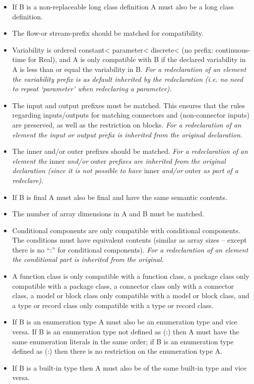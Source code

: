 \documentclass[10pt,a4paper]{report}
\begin{document}
\begin{itemize}
  \begin{itemize}
  \item
    If B is a non-replaceable long class definition A must also be a
    long class definition.
  \item
    The flow-or stream-prefix should be matched for compatibility.
  \item
    Variability is ordered constant\textless{} parameter\textless{}
    discrete\textless{} (no prefix: continuous-time for Real), and A is
    only compatible with B if the declared variability in A is less than
    or equal the variability in B. \emph{For a redeclaration of an
    element the variability prefix is as default inherited by the
    redeclaration (i.e. no need to repeat `parameter' when redeclaring a
    parameter).}
  \item
    The input and output prefixes must be matched. This ensures that the
    rules regarding inputs/outputs for matching connectors and
    (non-connector inputs) are preserved, as well as the restriction on
    blocks. \emph{For a redeclaration of an element the input or output
    prefix is inherited from the original declaration.}
  \item
    The inner and/or outer prefixes should be matched. \emph{For a
    redeclaration of an element the} inner \emph{and/or} outer
    \emph{prefixes are inherited from the original declaration (since it
    is not possible to have} inner \emph{and/or} outer \emph{as part of
    a redeclare)}.
  \item
    If B is final A must also be final and have the same semantic
    contents.
  \item
    The number of array dimensions in A and B must be matched.
  \item
    Conditional components are only compatible with conditional
    components. The conditions must have equivalent contents (similar as
    array sizes -- except there is no ``:'' for conditional components).
    \emph{For a redeclaration of an element the conditional part is
    inherited from the original.}
  \item
    A function class is only compatible with a function class, a package
    class only compatible with a package class, a connector class only
    with a connector class, a model or block class only compatible with
    a model or block class, and a type or record class only compatible
    with a type or record class.
  \item
    If B is an enumeration type A must also be an enumeration type and
    vice versa. If B is an enumeration type not defined as (:) then A
    must have the same enumeration literals in the same order; if B is
    an enumeration type defined as (:) then there is no restriction on
    the enumeration type A.
  \item
    If B is a built-in type then A must also be of the same built-in
    type and vice versa.
  \end{itemize}
\end{itemize}
\end{document}
